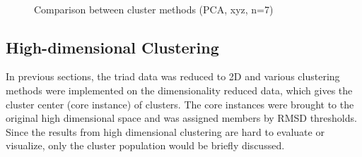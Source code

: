 \documentclass[a4paper]{article}
\begin{document}
\begin{figure}[H]
    \centering
     \\ 
    \caption{Comparison between cluster methods (PCA, xyz, n=7)}
    \label{fig: Pearson_R_methodcomp}
\end{figure}

\subsection{High-dimensional Clustering}

In previous sections, the triad data was reduced to 2D and various clustering methods were implemented on the dimensionality reduced data, which gives the cluster center (core instance) of clusters. The core instances were brought to the original high dimensional space and was assigned members by RMSD thresholds. Since the results from high dimensional clustering are hard to evaluate or visualize, only the cluster population would be briefly discussed.
\end{document}
